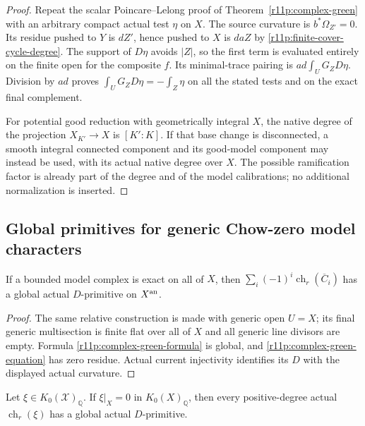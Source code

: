 \begin{proof}
Repeat the scalar Poincare--Lelong proof of
Theorem~\ref{r11p:complex-green} with an arbitrary compact actual
test $\eta$ on $X$.  The source curvature is
$b^*\Omega_{Z'}=0$.  Its residue pushed to $Y$ is $dZ'$, hence
pushed to $X$ is $daZ$ by
\eqref{r11p:finite-cover-cycle-degree}.  The support of $D\eta$
avoids $|Z|$, so the first term is evaluated entirely on the
finite open for the composite $f$.  Its minimal-trace pairing
is $ad\int_U G_ZD\eta$.  Division by $ad$ proves
$\int_U G_ZD\eta=-\int_Z\eta$ on all the stated tests and on the
exact final complement.

For potential good reduction with geometrically integral $X$, the
native degree of the projection $X_{K'}\to X$ is $[K':K]$.
If that base change is disconnected, a smooth integral connected
component and its good-model component may instead be used, with its
actual native degree over $X$.  The possible ramification factor is
already part of the degree and of the model calibrations; no
additional normalization is inserted.
\end{proof}

\subsection{Global primitives for generic Chow-zero model characters}

\begin{corollary}
\label{r11p:acyclic}
If a bounded model complex is exact on all of $X$, then
$\sum_i(-1)^i\operatorname{ch}_r(\overline C_i)$ has a global actual
$D$-primitive on $X^{\rm an}$.
\end{corollary}

\begin{proof}
The same relative construction is made with generic open $U=X$;
its final generic multisection is finite flat over all of $X$ and all
generic line divisors are empty.  Formula \eqref{r11p:complex-green-formula}
is global, and \eqref{r11p:complex-green-equation} has zero residue.
Actual current injectivity identifies its $D$ with the displayed
actual curvature.
\end{proof}

\begin{proposition}
\label{r11p:generic-k-primitive}
Let $\xi\in K_0(\mathcal X)_{\mathbb Q}$.  If $\xi|_X=0$ in
$K_0(X)_{\mathbb Q}$, then every positive-degree actual
$\operatorname{ch}_r(\xi)$ has a global actual $D$-primitive.
\end{proposition}

